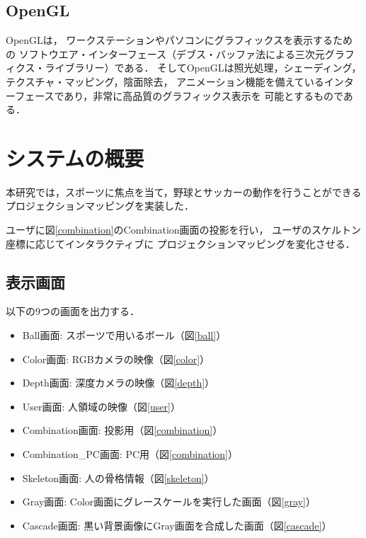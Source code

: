 \subsection{OpenGL}
OpenGL\cite{opengl3d}\cite{openglprogram}は，
ワークステーションやパソコンにグラフィックスを表示するための
ソフトウエア・インターフェース（デブス・バッファ法による三次元グラフィクス・ライブラリー）である．
そしてOpenGLは照光処理，シェーディング，テクスチャ・マッピング，陰面除去，
アニメーション機能を備えているインターフェースであり，非常に高品質のグラフィックス表示を
可能とするものである\cite{opengl}．

\clearpage

\section{システムの概要}
本研究では，スポーツに焦点を当て，野球とサッカーの動作を行うことができる
プロジェクションマッピングを実装した．

ユーザに図\ref{combination}のCombination画面の投影を行い，
ユーザのスケルトン座標に応じてインタラクティブに
プロジェクションマッピングを変化させる\cite{busan}\cite{ijrte}．



\subsection{表示画面}
以下の9つの画面を出力する．

\begin{itemize}
    \item Ball画面: スポーツで用いるボール（図\ref{ball}）
    \item Color画面: RGBカメラの映像（図\ref{color}）
    \item Depth画面: 深度カメラの映像（図\ref{depth}）
    \item User画面: 人領域の映像（図\ref{user}）
    \item Combination画面: 投影用（図\ref{combination}）
    \item Combination\_PC画面: PC用（図\ref{combination}）
    \item Skeleton画面: 人の骨格情報（図\ref{skeleton}）
    \item Gray画面: Color画面にグレースケールを実行した画面（図\ref{gray}）
    \item Cascade画面: 黒い背景画像にGray画面を合成した画面（図\ref{cascade}）
\end{itemize}

\clearpage

